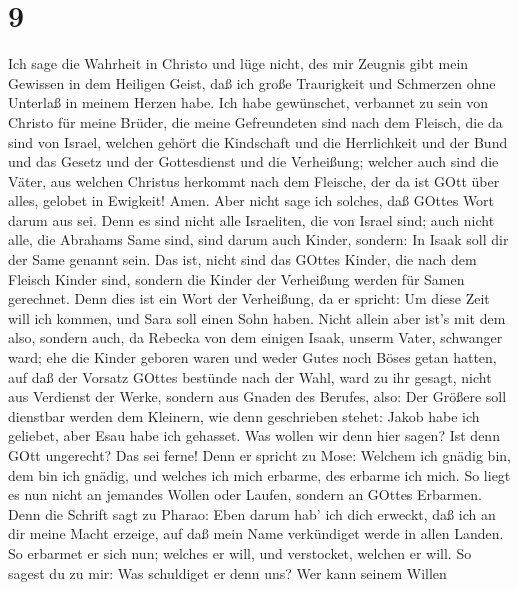 \hypertarget{section-8}{%
\section{9}\label{section-8}}

 Ich sage die Wahrheit in Christo und lüge nicht, des mir
Zeugnis gibt mein Gewissen in dem Heiligen Geist,  daß ich
große Traurigkeit und Schmerzen ohne Unterlaß in meinem Herzen habe.
 Ich habe gewünschet, verbannet zu sein von Christo für
meine Brüder, die meine Gefreundeten sind nach dem Fleisch, 
die da sind von Israel, welchen gehört die Kindschaft und die
Herrlichkeit und der Bund und das Gesetz und der Gottesdienst und die
Verheißung;  welcher auch sind die Väter, aus welchen
Christus herkommt nach dem Fleische, der da ist GOtt über alles, gelobet
in Ewigkeit! Amen.  Aber nicht sage ich solches, daß GOttes
Wort darum aus sei. Denn es sind nicht alle Israeliten, die von Israel
sind;  auch nicht alle, die Abrahams Same sind, sind darum
auch Kinder, sondern: In Isaak soll dir der Same genannt sein.
 Das ist, nicht sind das GOttes Kinder, die nach dem Fleisch
Kinder sind, sondern die Kinder der Verheißung werden für Samen
gerechnet.  Denn dies ist ein Wort der Verheißung, da er
spricht: Um diese Zeit will ich kommen, und Sara soll einen Sohn haben.
 Nicht allein aber ist's mit dem also, sondern auch, da
Rebecka von dem einigen Isaak, unserm Vater, schwanger ward;
 ehe die Kinder geboren waren und weder Gutes noch Böses
getan hatten, auf daß der Vorsatz GOttes bestünde nach der Wahl, ward zu
ihr gesagt,  nicht aus Verdienst der Werke, sondern aus
Gnaden des Berufes, also: Der Größere soll dienstbar werden dem
Kleinern,  wie denn geschrieben stehet: Jakob habe ich
geliebet, aber Esau habe ich gehasset.  Was wollen wir denn
hier sagen? Ist denn GOtt ungerecht? Das sei ferne!  Denn
er spricht zu Mose: Welchem ich gnädig bin, dem bin ich gnädig, und
welches ich mich erbarme, des erbarme ich mich.  So liegt
es nun nicht an jemandes Wollen oder Laufen, sondern an GOttes Erbarmen.
 Denn die Schrift sagt zu Pharao: Eben darum hab' ich dich
erweckt, daß ich an dir meine Macht erzeige, auf daß mein Name
verkündiget werde in allen Landen.  So erbarmet er sich
nun; welches er will, und verstocket, welchen er will.  So
sagest du zu mir: Was schuldiget er denn uns? Wer kann seinem Willen
